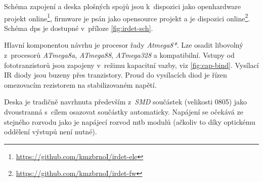 Schéma zapojení a deska plošných spojů jsou k~dispozici jako openhardware
projekt online\footnote{\url{https://github.com/kmzbrnoI/irdet-ele}}, firmware
je psán jako opensource projekt a je dispozici
online\footnote{\url{https://github.com/kmzbrnoI/irdet-fw}}.
Schéma \gls{dps} je dostupné v~příloze \ref{fig:irdet-sch}.

Hlavní komponentou návrhu je procesor řady \textit{Atmega8*}. Lze osadit
libovolný z~procesorů \textit{ATmega8a}, \textit{ATmega88}, \textit{ATmega328}
a kompatibilní. Vstupy od fototranzistorů jsou zapojeny v~režimu kapacitní
vazby, viz \ref{fig:cap-bind}. Vysílací IR diody jsou buzeny přes tranzistory.
Proud do vysílacích diod je řízen omezovacím rezistorem na stabilizovaném
napětí.

Deska je tradičně navrhnuta především z~\textit{SMD} součástek (velikosti 0805)
jako dvoustranná s~cílem osazovat součástky automaticky. Napájení se očekává
ze stejného rozvodu jako je napájecí rozvod \gls{mtb} modulů (ačkoliv to díky
optickému oddělení výstupů není nutné).
